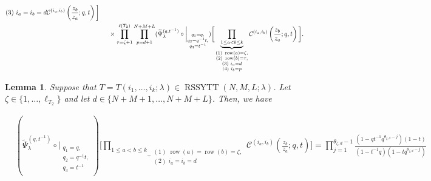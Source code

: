 \documentclass[12pt,reqno,a4paper]{amsart}
\newcommand{\comp}{\circ}
\newcommand{\cals}[1]{\mathcal{#1}}
\numberwithin{equation}{section}
\newtheorem{lem}[thm]{Lemma}
\theoremstyle{definition}
\begin{document}
\begin{align}
{{		(3) \,\, i_a = i_b = d
	}	
}
\cals{C}^{(i_a,i_b)}\left(
\frac{z_b}{z_a}
; q, t
\right)
\bigg]
\notag 
\\
&\hspace{0.5cm}\times 
\prod_{\tau = \zeta + 1}^{\ell(T_2)}
\prod_{p = d+1}^{N+M+L}
(
\widetilde{\Psi}_{\lambda}^{(q,t^{-1})}
\comp 
\bigg|_{
	\substack{
		q_1 = q, \\
		q_2 = q^{-1}t,\\
		q_3 = t^{-1} \\
	}
}
)
\bigg[
\underbrace{	\prod_{1 \leq a < b \leq k}				}_{
	\substack{
		(1) \,\, \operatorname{row}(a) = \zeta, 
		\\
		(2) \,\,  \operatorname{row}(b) = \tau, 
		\\
		(3) \,\, i_a = d
		\\
		(4) \,\, i_b = p
	}	
}
\cals{C}^{(i_a,i_b)}\left(
\frac{z_b}{z_a}
; q, t
\right)
\bigg]. 
\notag 
\end{align}
\normalsize


\begin{lem}
\label{lemm36-1329}
Suppose that $T = T(i_1,\dots,i_k;\lambda) \in \operatorname{RSSYTT}(N,M,L;\lambda)$. Let $\zeta \in \{1,\dots,\ell_{T_2}\}$ and let $d \in \{N+M+1,\dots,N+M+L\}$. Then, we have 

\footnotesize
\begin{align}
	&(
	\widetilde{\Psi}_{\lambda}^{(q,t^{-1})}
	\comp 
	\bigg|_{
		\substack{
			q_1 = q, \\
			q_2 = q^{-1}t,\\
			q_3 = t^{-1} \\
		}
	}
	)
	\bigg[
	\underbrace{	\prod_{1 \leq a < b \leq k}				}_{
		\substack{
			(1) \,\, \operatorname{row}(a) = \operatorname{row}(b) = \zeta, 
			\\
			(2) \,\, i_a = i_b = d
		}	
	}
	\cals{C}^{(i_a,i_b)}\left(
	\frac{z_b}{z_a}
	; q, t
	\right)
	\bigg]
	= 
	\prod_{j = 1}^{\theta_{\zeta,d} - 1}
	\frac{
		(1 - qt^{-1}q^{\theta_{\zeta,d} - j})(1 - t)
	}{
		(1 - t^{-1}q)(1 - tq^{\theta_{\zeta,d} - j})
	}
\end{align}
\normalsize
\end{lem}
\end{document}
